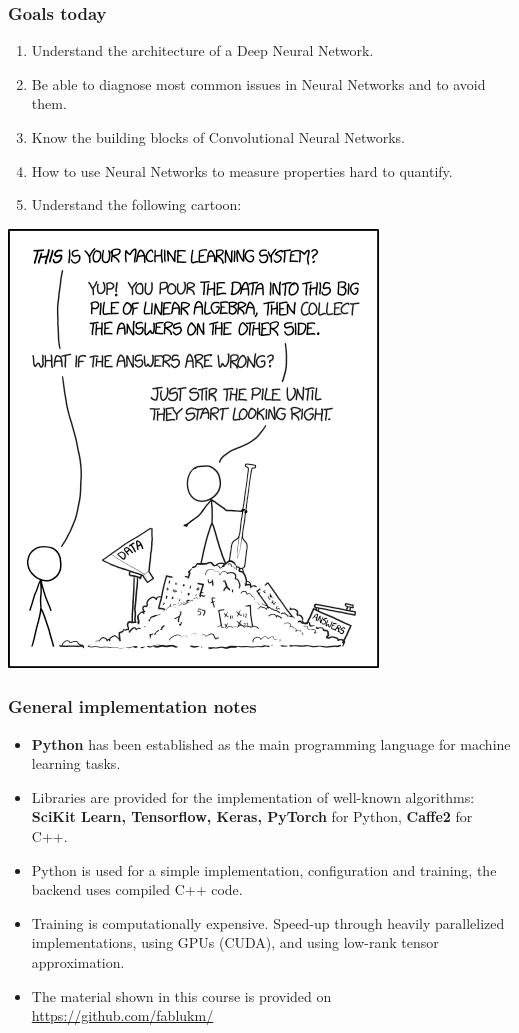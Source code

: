 \documentclass[10pt,hyperref={pdfpagelabels=false}]{beamer}
\begin{document}
\begin{frame}[allowframebreaks]
    \frametitle{Goals today}
        \begin{enumerate}
            \item Understand the architecture of a Deep Neural Network.
            \item Be able to diagnose most common issues in Neural Networks and to avoid them.
            \item Know the building blocks of Convolutional Neural Networks.
            \item How to use Neural Networks to measure properties hard to quantify.
            \framebreak
            \item Understand the following cartoon:
        \end{enumerate}
        \centering\includegraphics[height=.7\textheight]{figures/machine_learning.png}
\end{frame}
\begin{frame}
    \frametitle{General implementation notes}
    \begin{itemize}
        \item {\bf Python} has been established as the main programming language for machine learning tasks.
        \item Libraries are provided for the implementation of well-known algorithms: {\bf SciKit Learn, Tensorflow, Keras, PyTorch} for Python, {\bf Caffe2} for C++.
        \item Python is used for a simple implementation, configuration and training, the backend uses compiled C++ code.
        \item Training is computationally expensive. Speed-up through heavily parallelized implementations, using GPUs (CUDA), and using low-rank tensor approximation.
        \item The material shown in this course is provided on
        \url{https://github.com/fablukm/}
    \end{itemize}
\end{frame}
\end{document}

